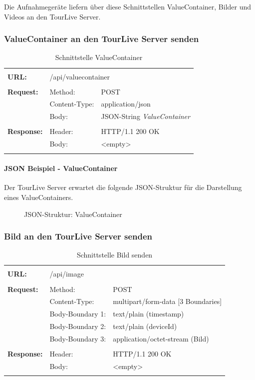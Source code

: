 Die Aufnahmegeräte liefern über diese Schnittstellen ValueContainer, Bilder und Videos an den TourLive Server.

\subsubsection{ValueContainer an den TourLive Server senden}
\begin{longtable}{ p{2.5cm} || p{3.5cm} p{5.5cm}}
&  \\ [-1.5ex]
	\textbf{URL:} & \multicolumn{2}{p{9cm}}{/api/valuecontainer} \\ [1ex] \hline & &  \\ [-1.5ex]
	\textbf{Request:} & Method: & POST \\
		& Content-Type: & application/json \\
		& Body: & JSON-String \textit{ValueContainer}\\ [1ex] \hline & &  \\ [-1.5ex]
	\textbf{Response:} & Header: & HTTP/1.1 200 OK \\
		& Body: & <empty> \\ [1ex] 
	\caption{Schnittstelle ValueContainer}
\end{longtable}

\paragraph{JSON Beispiel - ValueContainer}
Der TourLive Server erwartet die folgende JSON-Struktur für die Darstellung eines ValueContainers.

\begin{figure}[htb]
	\centering
	
	\caption{JSON-Struktur: ValueContainer}
	\label{fig:valuecontainer}
\end{figure}

\newpage
\subsubsection{Bild an den TourLive Server senden}
\begin{longtable}{ p{2.5cm} || p{3.5cm} p{5.5cm}}
&  \\ [-1.5ex]
	\textbf{URL:} & \multicolumn{2}{p{9cm}}{/api/image} \\ [1ex] \hline & &  \\ [-1.5ex]
	\textbf{Request:} & Method: & POST \\
		& Content-Type: & multipart/form-data [3 Boundaries] \\
		& Body-Boundary 1: & text/plain (timestamp) \\
		& Body-Boundary 2: & text/plain (deviceId) \\
		& Body-Boundary 3: & application/octet-stream (Bild)  \\ [1ex] \hline & &  \\ [-1.5ex]
	\textbf{Response:} & Header: & HTTP/1.1 200 OK \\
		& Body: & <empty>  \\ [1ex]  
	\caption{Schnittstelle Bild senden}
\end{longtable}

